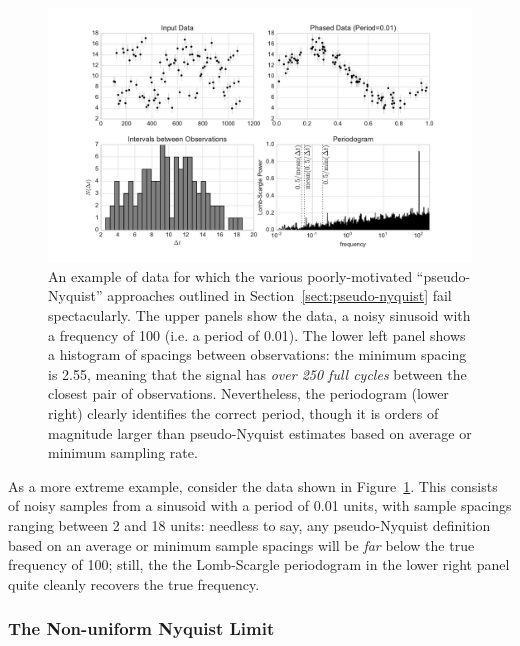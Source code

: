 \documentclass[preprint]{aastex}
\newcommand{\fig}[1]{Figure~\ref{fig:#1}}
\newcommand{\figlabel}[1]{\label{fig:#1}}
\newcommand{\Sect}[1]{Section~\ref{sect:#1}}
\newcommand{\sect}[1]{\Sect{#1}}
\newcommand{\sectlabel}[1]{\label{sect:#1}}
\begin{document}
\begin{figure}[ht]
  \centering
  \includegraphics[width=\textwidth]{fig12_pseudo_nyquist}
  \caption{An example of data for which the various poorly-motivated
    ``pseudo-Nyquist'' approaches outlined in \sect{pseudo-nyquist} fail
    spectacularly. The upper panels show the data, a noisy sinusoid with
    a frequency of 100 (i.e. a period of 0.01).
    The lower left panel shows a histogram of spacings between observations:
    the minimum spacing is 2.55, meaning that the signal has
    {\it over 250 full cycles} between the closest pair of observations.
    Nevertheless, the periodogram (lower right) clearly identifies the correct
    period, though it is orders of magnitude larger than pseudo-Nyquist
    estimates based on average or minimum sampling rate.
    \figlabel{pseudo-nyquist}}
\end{figure}

As a more extreme example, consider the data shown in \fig{pseudo-nyquist}.
This consists of noisy samples from a sinusoid with a period of 0.01 units,
with sample spacings ranging between 2 and 18 units: needless to say, any
pseudo-Nyquist definition based on an average or minimum sample spacings
will be {\it far} below the true frequency of 100; still, the
the Lomb-Scargle periodogram in the lower right panel quite cleanly
recovers the true frequency.

\subsubsection{The Non-uniform Nyquist Limit}
\sectlabel{non-uniform-nyquist}
\end{document}
